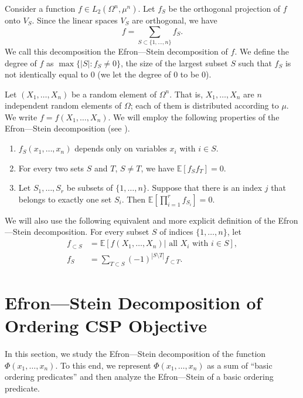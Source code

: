 \documentclass[11pt]{article}
\newcommand {\Exp}       {\mathbb{E}}
\newcommand {\E}     [1] {\Exp\left[#1\right]}
\begin{document}
Consider a function $f\in L_2(\Omega^n,\mu^n)$. Let $f_S$ be the orthogonal projection of $f$ onto $V_S$.
Since the linear spaces $V_S$ are orthogonal, we have
$$f = \sum_{S \subset \{1,\dots, n\}} f_S.$$
We call this decomposition the Efron---Stein decomposition of $f$. We define the degree of $f$ as $\max \{|S|: f_S \neq 0\}$,
the size of the largest subset $S$ such that  $f_S$ is not identically equal to $0$ (we let the degree of $0$ to be $0$).

Let $(X_1,\dots,X_n)$ be a random element of $\Omega^n$. That is, $X_1,\dots,X_n$ are $n$ independent random elements of $\Omega$; each of them is distributed according to $\mu$. We write $f = f(X_1,\dots, X_n)$.
We will employ the following properties of the Efron---Stein decomposition (see \cite[Section 8.3]{ODonnell}).
\begin{enumerate}
\item $f_S(x_1,\dots, x_n)$ depends only on variables $x_i$ with $i \in S$.
\item For every two sets $S$ and $T$, $S\neq T$, we have $\E{f_S f_T} = 0$.
\item Let $S_1, \dots, S_r$ be subsets of $\{1,\dots, n\}$. Suppose that there is an index $j$ that belongs to exactly
one set $S_i$. Then $\E{\prod_{i=1}^r f_{S_i} } = 0$.
\end{enumerate}

We will also use the following equivalent and more explicit definition of the Efron---Stein decomposition.
For every subset $S$ of indices $\{1,\dots, n\}$, let
\begin{align}
f_{\subset S} &= \E{f(X_1,\dots, X_n)| \text{ all } X_i \text{ with } i \in S},\label{eq:ES-1}\\
f_S &= \sum_{T\subset S} (-1)^{|S\setminus T|} f_{\subset T}.\label{eq:ES-2}
\end{align}

\section{Efron---Stein Decomposition of Ordering CSP Objective}\label{sec:ES-ordering-CSP}
In this section, we study the Efron---Stein
decomposition of the function $\Phi(x_1,\dots, x_n)$.
To this end, we represent $\Phi(x_1,\dots, x_n)$ as a sum of
``basic ordering predicates'' and then analyze the Efron---Stein of a basic ordering predicate.
\end{document}
